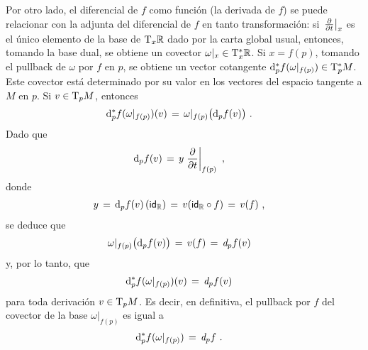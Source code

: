 Por otro lado, el diferencial de $f$ como funci\'{o}n (la derivada de $f$)
se puede relacionar con la adjunta del diferencial de $f$ en tanto
transformaci\'{o}n: si $\gancho[x]{t}$ es el \'{u}nico elemento de la
base de $\tangente[x]{\bb{R}}$ dado por la carta global usual, entonces,
tomando la base dual, se obtiene un covector $\omega|_{x}%
\in\tangente*[x]{\bb{R}}$. Si $x=f(p)$, tomando el pullback de $\omega$ por
$f$ en $p$, se obtiene un vector cotangente
$\diferencial*[p]{f}(\omega|_{f(p)})\in\tangente*[p]{M}$. Este covector
est\'{a} determinado por su valor en los vectores del espacio tangente
a $M$ en $p$. Si $v\in\tangente[p]{M}$, entonces
\begin{align*}
	\diferencial*[p]{f}(\omega|_{f(p)})(v) & \,=\,
		\omega|_{f(p)}\big(\diferencial[p]{f}(v)\big)
	\text{ .}
\end{align*}
%
Dado que
\begin{align*}
	\diferencial[p]{f}(v) & \,=\,y\gancho[f(p)]{t}
	\text{ ,}
\end{align*}
%
donde
\begin{align*}
	y & \,=\,\diferencial[p]{f}(v)\,(\id[\bb{R}]) \,=\,
		v(\id[\bb{R}]\circ f) \,=\, v(f)
	\text{ ,}
\end{align*}
%
se deduce que
\begin{align*}
	\omega|_{f(p)}\big(\diferencial[p]{f}(v)\big)
	& \,=\,v(f) \,=\,\derext[p]{f}(v)
\end{align*}
%
y, por lo tanto, que
\begin{align*}
	\diferencial*[p]{f}(\omega|_{f(p)})(v) & \,=\,
		\derext[p]{f}(v)
\end{align*}
%
para toda derivaci\'{o}n $v\in\tangente[p]{M}$. Es decir, en definitiva,
el pullback por $f$ del covector de la base $\omega|_{f(p)}$ es igual a
\begin{align*}
	\diferencial*[p]{f}(\omega|_{f(p)}) & \,=\,
		\derext[p]{f}
	\text{ .}
\end{align*}
%

